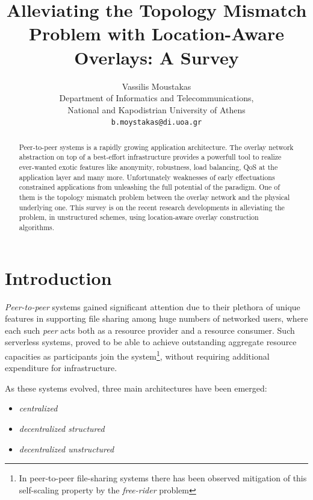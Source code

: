 \documentclass[a4paper,10pt]{article}
\title{Alleviating the Topology Mismatch Problem with Location-Aware Overlays: A Survey}
\author{
Vassilis Moustakas\\
Department of Informatics and Telecommunications,\\
National and Kapodistrian University of Athens\\
\mbox{\texttt{b.moystakas@di.uoa.gr}}
}
\begin{document}
\maketitle

\begin{abstract}
Peer-to-peer systems is a rapidly growing application architecture. The overlay network abstraction on top of a best-effort infrastructure provides a powerfull tool to realize ever-wanted exotic features like anonymity, robustness, load balancing, QoS at the application layer and many more. Unfortunately weaknesses of early effectuations constrained applications from unleashing the full potential of the paradigm. One of them is the topology mismatch problem between the overlay network and the physical underlying one. This survey is on the recent research developments in alleviating the problem, in unstructured schemes, using location-aware overlay construction algorithms.
\end{abstract}

\section{Introduction}
\emph{Peer-to-peer} systems gained significant attention due to their plethora of unique features in supporting file sharing among huge numbers of networked users, where each such \emph{peer} acts both as a resource provider and a resource consumer. Such serverless systems, proved to be able to achieve outstanding aggregate resource capacities as participants join the system\footnote{In peer-to-peer file-sharing systems there has been observed mitigation of this self-scaling property by the \emph{free-rider} problem\cite{adar_gnutellafreeriders_2000}}, without requiring additional expenditure for infrastructure.

As these systems evolved, three main architectures have been emerged:
\begin{itemize}
  \item \emph{centralized}
  \item \emph{decentralized structured}
  \item \emph{decentralized unstructured}
\end{itemize}
\end{document}
